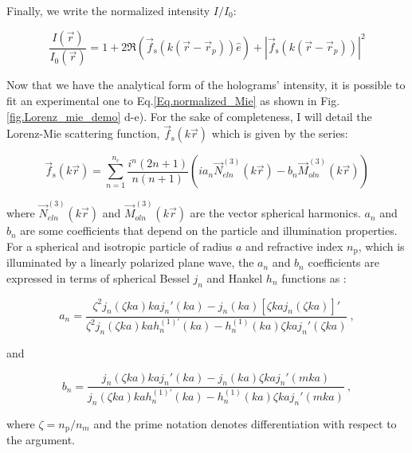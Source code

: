  Finally, we write the normalized intensity $I/I_0$:

\begin{equation}
	\frac{I(\vec{r})}{I_0(\vec{r})} = 1 + 2 \Re 
	\left(  
		\vec{f}_\mathrm{s}(k(\vec{r}- \vec{r}_p)) \hat{e}
	\right)
	+
	|
		\vec{f}_\mathrm{s}(k(\vec{r}- \vec{r}_p))
	|^2
	\label{Eq.normalized_Mie}	
\end{equation}


Now that we have the analytical form of the holograms' intensity, it is possible to fit an experimental one to Eq.\ref{Eq.normalized_Mie} as shown in Fig.\ref{fig.Lorenz_mie_demo} d-e). For the sake of completeness, I will detail the Lorenz-Mie scattering function, $\vec{f}_\mathrm{s}(k\vec{r})$ which is given by the series:

\begin{equation}
	\vec{f}_\mathrm{s}(k \vec{r}) = \sum _{n=1} ^{n_c} 
	\frac
	{
		i^n (2n +1)
	}
	{
		n(n+1)
	}
	\left(
		i a_n \vec{N}^{(3)}_{eln}(k\vec{r})
		-
		b_n \vec{M}^{(3)}_{oln}(k\vec{r})
	\right)
	\label{Eq.Lorenz-Mie-function}
\end{equation} 


where $\vec{N}^{(3)}_{eln}(k\vec{r})$ and $\vec{M}^{(3)}_{oln}(k\vec{r})$ are the vector spherical harmonics. $a_n$ and $b_n$ are some coefficients that depend on the particle and illumination properties. For a spherical and isotropic particle of radius $a$ and refractive index $n_\mathrm{p}$, which is illuminated by a linearly polarized plane wave, the $a_n$ and $b_n$ coefficients are expressed in terms of spherical Bessel $j_n$ and Hankel $h_n$ functions as \cite{f_bohren_absorption_1998}:

\begin{equation}
	a_n = 
	\frac
	{
		\zeta^2 j_n (\zeta k a)k a j_n' (k a) - j_n(ka)[\zeta kaj_n(\zeta ka)]'
	}
	{
		\zeta^2 j_n (\zeta k a)k a h_n^{(1)'} (k a) - h_n^{(1)}(ka)\zeta kaj_n'(\zeta ka)
	} ~,
	\label{Eq:an}
\end{equation}

and

\begin{equation}
	b_n =
	\frac
	{
		j_n(\zeta k a) kaj_n'(ka) - j_n (ka) \zeta kaj_n'(mka)
	}
	{
		j_n(\zeta k a) kah_n^{(1)'}(ka) - h_n^{(1)} (ka) \zeta kaj_n '(mka)
	} ~,
	\label{Eq:bn}
\end{equation}


where $\zeta = n_\mathrm{p} / n_m $ and the prime notation denotes differentiation with respect to the argument. 
	
